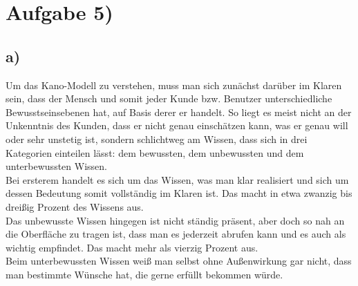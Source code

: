 \documentclass{swp1}
\begin{document}
\section*{Aufgabe 5)}
\subsection*{a)}
Um das Kano-Modell zu verstehen, muss man sich zunächst darüber im Klaren sein, dass der Mensch und somit jeder Kunde bzw. Benutzer unterschiedliche Bewusstseinsebenen hat, auf Basis derer er handelt. So liegt es meist nicht an der Unkenntnis des Kunden, dass er nicht genau einschätzen kann, was er genau will oder sehr unstetig ist, sondern schlichtweg am Wissen, dass sich in drei Kategorien einteilen lässt: dem bewussten, dem unbewussten und dem unterbewussten Wissen.\\
Bei ersterem handelt es sich um das Wissen, was man klar realisiert und sich um dessen Bedeutung somit vollständig im Klaren ist. Das macht in etwa zwanzig bis dreißig Prozent des Wissens aus. \\
Das unbewusste Wissen hingegen ist nicht ständig präsent, aber doch so nah an die Oberfläche zu tragen ist, dass man es jederzeit abrufen kann und es auch als wichtig empfindet. Das macht mehr als vierzig Prozent aus.\\
Beim unterbewussten Wissen weiß man selbst ohne Außenwirkung gar nicht, dass man bestimmte Wünsche hat, die gerne erfüllt bekommen würde.\\
\end{document}
